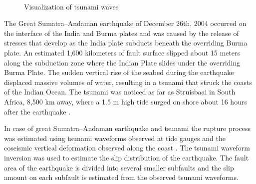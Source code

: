 \documentclass{usiinftr}
\begin{document}
\begin{figure}
\centering
\mbox{
}
\quad
\mbox{
}
\caption{Visualization of tsunami waves}
\label{fig:visualization}
\end{figure}

The Great Sumatra--Andaman earthquake of December 26th, 2004 occurred on the interface of the India and Burma plates
and was caused by the release of stresses that develop as the India plate subducts beneath the overriding
Burma plate. An estimated 1,600 kilometers  of fault surface slipped about 15 meters
along the subduction zone where the Indian Plate slides under the overriding Burma Plate. The sudden vertical
rise of the seabed during the earthquake displaced massive volumes of water, resulting in a tsunami
that struck the coasts of the Indian Ocean. The tsunami was noticed as far as Struisbaai in South Africa,
8,500 km away, where a 1.5 m high tide surged on shore about 16 hours after the earthquake \cite{sumatra}.

In case of great Sumatra--Andaman earthquake and tsunami the rupture process was estimated using tsunami waveforms observed at
tide gauges and the coseismic vertical deformation observed along the coast \cite{sumatraPaper}. The tsunami waveform inversion was used to estimate the slip
distribution of the earthquake. The fault area of the earthquake is divided into several smaller subfaults and the slip amount on each subfault
is estimated from the observed tsunami waveforms. 
\end{document}
